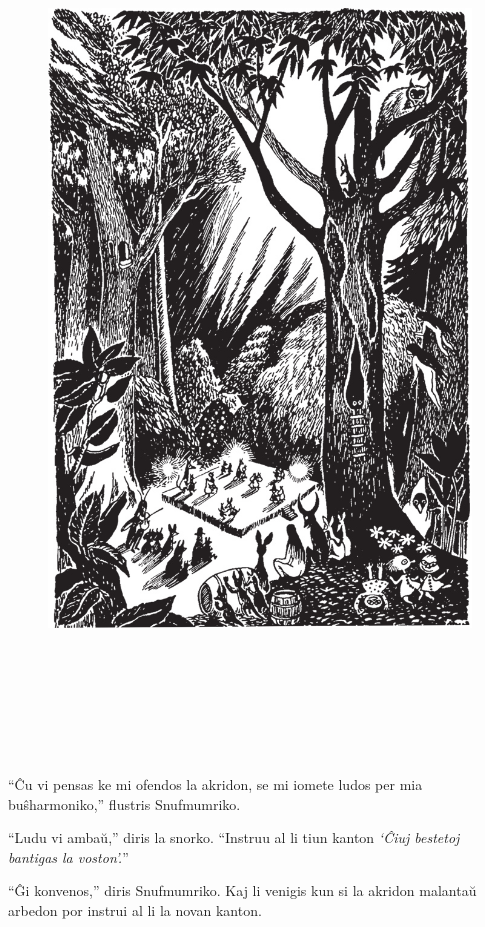 \begin{figure}[htbp]
\centering
\includegraphics[width=450pt,height=658pt]{6-6.png}
\caption{}
\label{6-6}
\end{figure}

``Ĉu vi pensas ke mi ofendos la akridon, se mi iomete ludos per mia buŝharmoniko,'' flustris Snufmumriko.

``Ludu vi ambaŭ,'' diris la snorko. ``Instruu al li tiun kanton \emph{`Ĉiuj bestetoj bantigas la voston'.}''

``Ĝi konvenos,'' diris Snufmumriko. Kaj li venigis kun si la akridon malantaŭ arbedon por instrui al li la novan kanton.


